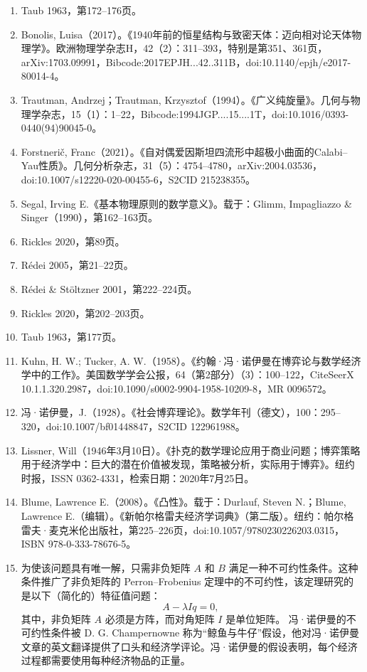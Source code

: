 \begin{enumerate}
\item Taub 1963，第172–176页。  
\item Bonolis, Luisa（2017）。《1940年前的恒星结构与致密天体：迈向相对论天体物理学》。欧洲物理学杂志H，42（2）：311–393，特别是第351、361页，arXiv:1703.09991，Bibcode:2017EPJH...42..311B，doi:10.1140/epjh/e2017-80014-4。  
\item Trautman, Andrzej；Trautman, Krzysztof（1994）。《广义纯旋量》。几何与物理学杂志，15（1）：1–22，Bibcode:1994JGP....15....1T，doi:10.1016/0393-0440(94)90045-0。  
\item Forstnerič, Franc（2021）。《自对偶爱因斯坦四流形中超极小曲面的Calabi–Yau性质》。几何分析杂志，31（5）：4754–4780，arXiv:2004.03536，doi:10.1007/s12220-020-00455-6，S2CID 215238355。  
\item Segal, Irving E.《基本物理原则的数学意义》。载于：Glimm, Impagliazzo & Singer（1990），第162–163页。
\item Rickles 2020，第89页。  
\item Rédei 2005，第21–22页。  
\item Rédei & Stöltzner 2001，第222–224页。  
\item Rickles 2020，第202–203页。  
\item Taub 1963，第177页。  
\item Kuhn, H. W.; Tucker, A. W.（1958）。《约翰·冯·诺伊曼在博弈论与数学经济学中的工作》。美国数学学会公报，64（第2部分）（3）：100–122，CiteSeerX 10.1.1.320.2987，doi:10.1090/s0002-9904-1958-10209-8，MR 0096572。  
\item 冯·诺伊曼，J.（1928）。《社会博弈理论》。数学年刊（德文），100：295–320，doi:10.1007/bf01448847，S2CID 122961988。  
\item Lissner, Will（1946年3月10日）。《扑克的数学理论应用于商业问题；博弈策略用于经济学中：巨大的潜在价值被发现，策略被分析，实际用于博弈》。纽约时报，ISSN 0362-4331，检索日期：2020年7月25日。  
\item Blume, Lawrence E.（2008）。《凸性》。载于：Durlauf, Steven N.；Blume, Lawrence E.（编辑）。《新帕尔格雷夫经济学词典》（第二版）。纽约：帕尔格雷夫·麦克米伦出版社，第225–226页，doi:10.1057/9780230226203.0315，ISBN 978-0-333-78676-5。
\item 为使该问题具有唯一解，只需非负矩阵 \(A\) 和 \(B\) 满足一种不可约性条件。这种条件推广了非负矩阵的 Perron–Frobenius 定理中的不可约性，该定理研究的是以下（简化的）特征值问题：
\[
A - \lambda I q = 0,~
\]
其中，非负矩阵 \(A\) 必须是方阵，而对角矩阵 \(I\) 是单位矩阵。
冯·诺伊曼的不可约性条件被 D. G. Champernowne 称为“鲸鱼与牛仔”假设，他对冯·诺伊曼文章的英文翻译提供了口头和经济学评论。冯·诺伊曼的假设表明，每个经济过程都需要使用每种经济物品的正量。

\end{enumerate}
